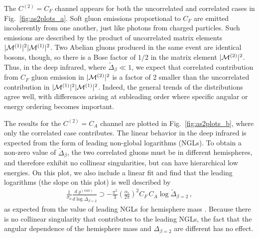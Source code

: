 \documentclass[letterpaper,11pt]{article}
\DeclareRobustCommand{\Fig}[1]{Fig.~\ref{#1}}
\begin{document}
The $C^{(2)}=C_F$ channel appears for both the uncorrelated and correlated cases in \Fig{fig:as2plots_a}.  
%
Soft gluon emissions proportional to $C_F$ are emitted incoherently from one another, just like photons from charged particles.
%
Such emissions are described by the product of uncorrelated matrix elements $|{\cal M}^{(1)}|^2|{\cal M}^{(1)}|^2$.  
%
Two Abelian gluons produced in the same event are identical bosons, though, so there is a Bose factor of $1/2$ in the matrix element $|{\cal M}^{(2)}|^2$.  
%
Thus, in the deep infrared, where $\tilde \Delta_{\beta}\ll 1$, we expect that correlated contribution from $C_F$ gluon emission in $|{\cal M}^{(2)}|^2$ is a factor of 2 smaller than the uncorrelated contribution in $|{\cal M}^{(1)}|^2|{\cal M}^{(1)}|^2$.  
%
Indeed, the general trends of the distributions agree well, with differences arising at subleading order where specific angular or energy ordering becomes important.


The results for the $C^{(2)}=C_A$ channel are plotted in \Fig{fig:as2plots_b}, where only the correlated case contributes. 
%
The linear behavior in the deep infrared is expected from the form of leading non-global logarithms (NGLs).  
%
To obtain a non-zero value of $\tilde \Delta_{\beta}$, the two correlated gluons must be in different hemispheres, and therefore exhibit no collinear singularities, but can have hierarchical low energies.  
%
On this plot, we also include a linear fit and find that the leading logarithms (the slope on this plot) is well described by
%
\begin{align}
\frac{1}{\sigma_0}\frac{d\varrho^{(\text{corr})}}{d\log \tilde{\Delta}_{\beta = 2}}\supset -\frac{\pi^2}{3}\left(\frac{\alpha_s}{2\pi}\right)^2C_F \, C_A \log \tilde{\Delta}_{\beta = 2}\,,
\end{align}
%
as expected from the value of leading NGLs for hemisphere mass \cite{Dasgupta:2001sh}.  
%
Because there is no collinear singularity that contributes to the leading NGLs, the fact that the angular dependence of the hemisphere mass and $\Delta_{\beta = 2}$ are different has no effect.
\end{document}
